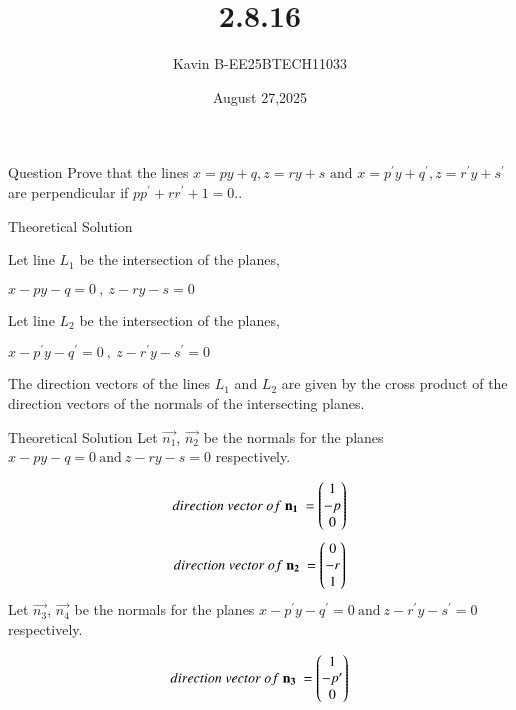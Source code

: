 \documentclass{beamer}
\begin{document}
\title 
{2.8.16}
\date{August 27,2025}


\author 
{Kavin B-EE25BTECH11033}






\frame{\titlepage}
\begin{frame}{Question}
Prove that the lines $x=py+q , z=ry+s \text{ and } x=p^{\prime}y+q^{\prime}, z=r^{\prime}y+s^{\prime} $ are perpendicular if $pp^{\prime}+rr^{\prime}+1=0$..
\end{frame}



\begin{frame}{Theoretical Solution}

Let line $L_1$ be the intersection of the planes,
\begin{center}
    $x-py-q=0\ ,\ z-ry-s=0$
\end{center}
Let line $L_2$ be the intersection of the planes,
\begin{center}
    $x-p^{\prime}y-q^{\prime}=0\ ,\ z-r^{\prime}y-s^{\prime}=0$
\end{center}
\bigskip
The direction vectors of the lines $L_1$ and $L_2$ are given by the cross product of the direction vectors of the normals of the intersecting planes.\\ 
\end{frame}

\begin{frame}{Theoretical Solution}
Let $\vec{n_1}$, $\vec{n_2}$ be the normals for the planes $x-py-q=0\ \text{and}\ z-ry-s=0$ respectively.

\begin{align}
    direction\ vector\ of\ \mathbf{n_1}\ = \begin{pmatrix}1\\-p\\0\end{pmatrix}
\end{align}
\begin{align}
    direction\ vector\ of\ \mathbf{n_2}\ = \begin{pmatrix}0\\-r\\1\end{pmatrix}
\end{align}
Let $\vec{n_3}$, $\vec{n_4}$ be the normals for the planes $x-p^{\prime}y-q^{\prime}=0\ \text{and}\ z-r^{\prime}y-s^{\prime}=0$ respectively.

\begin{align}
    direction\ vector\ of\ \mathbf{n_3}\ = \begin{pmatrix}1\\-p^{\prime}\\0\end{pmatrix}
\end{align}
\end{frame}
\end{document}
